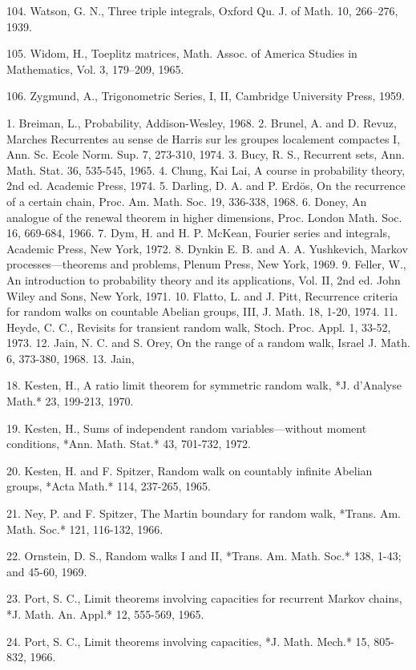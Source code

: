 104. Watson, G. N., Three triple integrals, Oxford Qu. J. of Math. 10, 266–276, 1939.

105. Widom, H., Toeplitz matrices, Math. Assoc. of America Studies in Mathematics, Vol. 3, 179–209, 1965.

106. Zygmund, A., Trigonometric Series, I, II, Cambridge University Press, 1959.

1. Breiman, L., Probability, Addison-Wesley, 1968.
2. Brunel, A. and D. Revuz, Marches Recurrentes au sense de Harris sur les groupes localement compactes I, Ann. Sc. Ecole Norm. Sup. 7, 273-310, 1974.
3. Bucy, R. S., Recurrent sets, Ann. Math. Stat. 36, 535-545, 1965.
4. Chung, Kai Lai, A course in probability theory, 2nd ed. Academic Press, 1974.
5. Darling, D. A. and P. Erdös, On the recurrence of a certain chain, Proc. Am. Math. Soc. 19, 336-338, 1968.
6. Doney, An analogue of the renewal theorem in higher dimensions, Proc. London Math. Soc. 16, 669-684, 1966.
7. Dym, H. and H. P. McKean, Fourier series and integrals, Academic Press, New York, 1972.
8. Dynkin E. B. and A. A. Yushkevich, Markov processes—theorems and problems, Plenum Press, New York, 1969.
9. Feller, W., An introduction to probability theory and its applications, Vol. II, 2nd ed. John Wiley and Sons, New York, 1971.
10. Flatto, L. and J. Pitt, Recurrence criteria for random walks on countable Abelian groups, III, J. Math. 18, 1-20, 1974.
11. Heyde, C. C., Revisits for transient random walk, Stoch. Proc. Appl. 1, 33-52, 1973.
12. Jain, N. C. and S. Orey, On the range of a random walk, Israel J. Math. 6, 373-380, 1968.
13. Jain,

18. Kesten, H., A ratio limit theorem for symmetric random walk, *J. d'Analyse Math.* 23, 199-213, 1970.

19. Kesten, H., Sums of independent random variables—without moment conditions, *Ann. Math. Stat.* 43, 701-732, 1972.

20. Kesten, H. and F. Spitzer, Random walk on countably infinite Abelian groups, *Acta Math.* 114, 237-265, 1965.

21. Ney, P. and F. Spitzer, The Martin boundary for random walk, *Trans. Am. Math. Soc.* 121, 116-132, 1966.

22. Ornstein, D. S., Random walks I and II, *Trans. Am. Math. Soc.* 138, 1-43; and 45-60, 1969.

23. Port, S. C., Limit theorems involving capacities for recurrent Markov chains, *J. Math. An. Appl.* 12, 555-569, 1965.

24. Port, S. C., Limit theorems involving capacities, *J. Math. Mech.* 15, 805-832, 1966.

